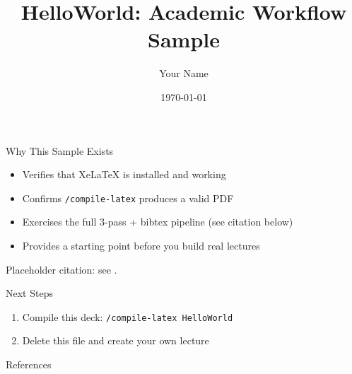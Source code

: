 \documentclass{beamer}
\title{HelloWorld: Academic Workflow Sample}
\author{Your Name}
\institute{Your Institution}
\date{\today}
\begin{document}
\frame{\titlepage}

\begin{frame}{Why This Sample Exists}
    \begin{itemize}
        \item Verifies that XeLaTeX is installed and working
        \item Confirms \texttt{/compile-latex} produces a valid PDF
        \item Exercises the full 3-pass + bibtex pipeline (see citation below)
        \item Provides a starting point before you build real lectures
    \end{itemize}
    Placeholder citation: see \cite{Example2024_book}.
\end{frame}

\begin{frame}{Next Steps}
    \begin{enumerate}
        \item Compile this deck: \texttt{/compile-latex HelloWorld}
        \item Delete this file and create your own lecture
    \end{enumerate}
\end{frame}

\begin{frame}{References}
    
    
\end{frame}
\end{document}
